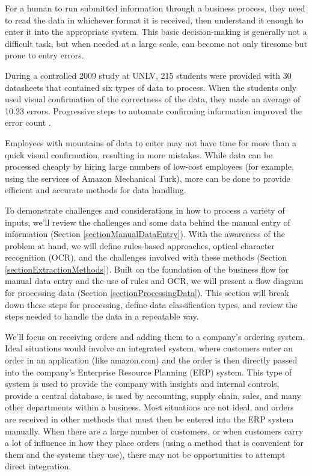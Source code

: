 \documentclass[conference]{IEEEtran}
\begin{document}
For a human to run submitted information through a business process, they need to read the data in whichever format it is received, then understand it enough to enter it into the appropriate system. This basic decision-making is generally not a difficult task, but when needed at a large scale, can become not only tiresome but prone to entry errors. 

During a controlled 2009 study at UNLV, 215 students were provided with 30 datasheets that contained six types of data to process. When the students only used visual confirmation of the correctness of the data, they made an average of 10.23 errors. Progressive steps to automate confirming information improved the error count \cite{harris2014when}.

Employees with mountains of data to enter may not have time for more than a quick visual confirmation, resulting in more mistakes. While data can be processed cheaply by hiring large numbers of low-cost employees (for example, using the services of Amazon Mechanical Turk), more can be done to provide efficient and accurate methods for data handling.

To demonstrate challenges and considerations in how to process a variety of inputs, we'll review the challenges and some data behind the manual entry of information (Section \ref{sectionManualDataEntry}). With the awareness of the problem at hand, we will define rules-based approaches, optical character recognition (OCR), and the challenges involved with these methods (Section \ref{sectionExtractionMethods}). Built on the foundation of the business flow for manual data entry and the use of rules and OCR, we will present a flow diagram for processing data (Section \ref{sectionProcessingData}). This section will break down these steps for processing, define data classification types, and review the steps needed to handle the data in a repeatable way.

We'll focus on receiving orders and adding them to a company's ordering system. Ideal situations would involve an integrated system, where customers enter an order in an application (like amazon.com) and the order is then directly passed into the company's Enterprise Resource Planning (ERP) system. This type of system is used to provide the company with insights and internal controls, provide a central database, is used by accounting, supply chain, sales, and many other departments within a business. Most situations are not ideal, and orders are received in other methods that must then be entered into the ERP system manually. When there are a large number of customers, or when customers carry a lot of influence in how they place orders (using a method that is convenient for them and the systems they use), there may not be opportunities to attempt direct integration.
\end{document}
